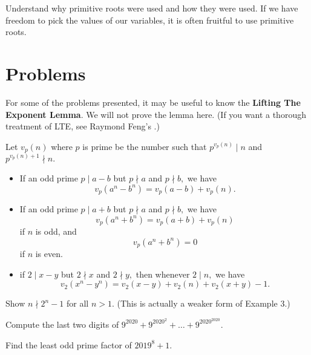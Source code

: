\documentclass{article}
\begin{document}
Understand why primitive roots were used and how they were used. If we have freedom to pick the values of our variables, it is often fruitful to use primitive roots.

\pagebreak

\section{Problems}

For some of the problems presented, it may be useful to know the \textbf{Lifting The Exponent Lemma}. We will not prove the lemma here. (If you want a thorough treatment of LTE, see Raymond Feng's .)

\begin{theo}
Let $v_p(n)$ where $p$ is prime be the number such that $p^{v_p(n)} \mid n$ and $p ^{v_p(n)+1} \nmid n.$

\begin{itemize}
    \item If an odd prime $p \mid a-b$ but $p \nmid a$ and $p \nmid b,$ we have $$v_p(a^n - b^n) = v_p(a-b)+v_p(n).$$

    \item If an odd prime $p \mid a+b$ but $p \nmid a$ and $p \nmid b,$ we have $$v_p(a^n + b^n) = v_p(a+b)+v_p(n)$$ if $n$ is odd, and $$v_p(a^n + b^n) = 0$$ if $n$ is even.

    \item if $2 \mid x - y$ but $2 \nmid x$ and $2 \nmid y,$ then whenever $2 \mid n,$ we have $$v_2(x^n-y^n) = v_2(x-y)+v_2(n)+v_2(x+y)-1.$$
\end{itemize}
\end{theo}

\noindent{}


\begin{prob}[]{1}
Show $n \nmid 2^n-1$ for all $n>1.$ (This is actually a weaker form of Example 3.)
\end{prob}

\begin{prob}{1}
Compute the last two digits of $9^{2020}+9^{2020^2}+\ldots +9^{2020^{2020}}$.
\end{prob}

\begin{prob}[AIME I 2019/14]{2}
Find the least odd prime factor of $2019^8+1$.
\end{prob}
\end{document}
